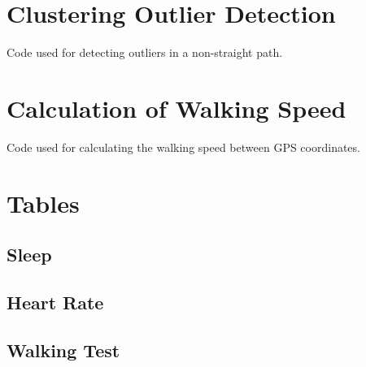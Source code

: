 \newpage

\section{Clustering Outlier Detection}
%
\begin{code}
	
	\caption{Code used for detecting outliers in a non-straight path.}
	\label{GPS Smoothing Code Non-Straight Line}
\end{code}
%

\newpage

\section{Calculation of Walking Speed}
%
\begin{code}
	
	\caption{Code used for calculating the walking speed between GPS coordinates.}
	\label{walk test code snippet}
\end{code}
%


\section{Tables}
\subsection{Sleep}

\subsection{Heart Rate}

\subsection{Walking Test}



